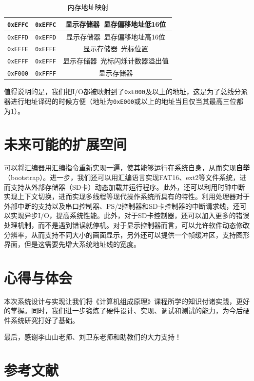 \documentclass[11pt,utf8]{report}
\begin{document}
\begin{table}[H]
\begin{tabular}{c|c|c}
\texttt{0xEFFC} & \texttt{0xEFFC} & 显示存储器~显存偏移地址低16位 \\ \hline
\texttt{0xEFFD} & \texttt{0xEFFD} & 显示存储器~显存偏移地址高16位 \\ \hline
\texttt{0xEFFE} & \texttt{0xEFFE} & 显示存储器~光标位置 \\ \hline
\texttt{0xEFFF} & \texttt{0xEFFF} & 显示存储器~光标闪烁计数器溢出值 \\ \hline
\texttt{0xF000} & \texttt{0xFFFF} & 显示存储器 \\
\bottomrule[1.2pt]
\end{tabular}
\caption{内存地址映射}
\label{mmap}
\end{table}

	\par 值得说明的是，我们把I/O都被映射到了\texttt{0xE000}及以上的地址，这是为了总线分派器进行地址译码的时候方便（地址为\texttt{0xE000}或以上的地址当且仅当其最高三位都为1）。

\chapter{未来可能的扩展空间}
	\par 可以将汇编器用汇编指令重新实现一遍，使其能够运行在系统自身，从而实现\textbf{自举}（bootstrap）。进一步，我们还可以用汇编语言实现FAT16、ext2等文件系统，进而支持从外部存储器（SD卡）动态加载并运行程序。此外，还可以利用时钟中断实现上下文切换，进而实现多线程等现代操作系统所具有的特性。利用处理器对于外部中断的支持以及串口控制器、PS/2控制器和SD卡控制器的中断请求线，还可以实现异步I/O，提高系统性能。此外，对于SD卡控制器，还可以加入更多的错误处理机制，而不是遇到错误就停机。对于显示控制器而言，可以允许软件动态修改分辨率，从而支持不同大小的画面显示，另外还可以提供一个帧缓冲区，支持图形界面，但是这需要先增大系统地址线的宽度。

\chapter{心得与体会}
	\par 本次系统设计与实现让我们将《计算机组成原理》课程所学的知识付诸实践，更好的掌握。同时，我们进一步锻炼了硬件设计、实现、调试和测试的能力，为今后硬件系统研究打好了基础。
	\par 最后，感谢李山山老师、刘卫东老师和助教们的大力支持！

\chapter{参考文献}
\end{document}
